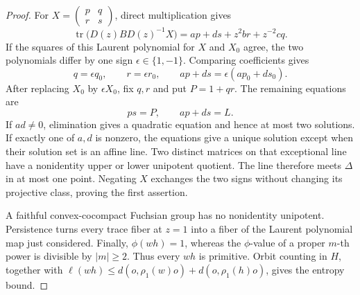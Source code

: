 \documentclass[11pt,reqno]{amsart}
\theoremstyle{definition}
\theoremstyle{remark}
\newcommand{\Tr}{\operatorname{tr}}
\begin{document}
\begin{proof}
For \(X=(\begin{smallmatrix}p&q\\r&s\end{smallmatrix})\), direct
multiplication gives
\[
 \Tr\!\bigl(D(z)BD(z)^{-1}X\bigr)
 =ap+ds+z^2br+z^{-2}cq.
\]
If the squares of this Laurent polynomial for \(X\) and \(X_0\) agree,
the two polynomials differ by one sign
\(\epsilon\in\{1,-1\}\).  Comparing coefficients gives
\[
 q=\epsilon q_0,\qquad r=\epsilon r_0,\qquad
 ap+ds=\epsilon(ap_0+ds_0).
\]
After replacing \(X_0\) by \(\epsilon X_0\), fix \(q,r\) and put
\(P=1+qr\).  The remaining equations are
\[
 ps=P,\qquad ap+ds=L.
\]
If \(ad\ne0\), elimination gives a quadratic equation and hence at most
two solutions.  If exactly one of \(a,d\) is nonzero, the equations give a
unique solution except when their solution set is an affine line.  Two
distinct matrices on that exceptional line have a nonidentity upper or
lower unipotent quotient.  The line therefore meets \(\Delta\) in at most
one point.  Negating \(X\) exchanges the two signs without changing its
projective class, proving the first assertion.

A faithful convex-cocompact Fuchsian group has no nonidentity unipotent.
Persistence turns every trace fiber at \(z=1\) into a fiber of the Laurent
polynomial map just considered.  Finally, \(\phi(wh)=1\), whereas the
\(\phi\)-value of a proper \(m\)-th power is divisible by
\(|m|\ge2\).  Thus every \(wh\) is primitive.  Orbit counting in \(H\),
together with \(\ell(wh)\le d(o,\rho_1(w)o)+d(o,\rho_1(h)o)\), gives the
entropy bound.
\end{proof}
\end{document}
